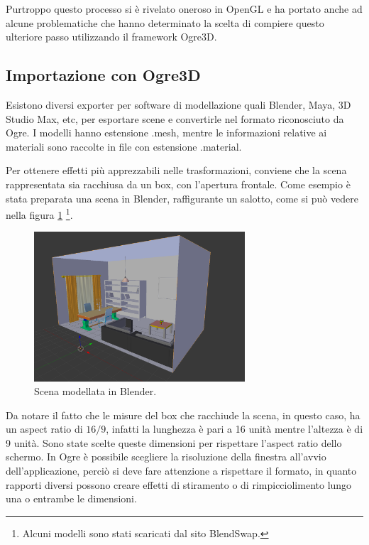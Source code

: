 Purtroppo questo processo si è rivelato oneroso in OpenGL e ha portato anche ad alcune problematiche che hanno determinato la scelta di compiere questo ulteriore passo utilizzando il framework Ogre3D.

\subsection{Importazione con Ogre3D}
Esistono diversi exporter per software di modellazione quali Blender, Maya, 3D Studio Max, etc, per esportare scene e convertirle nel formato riconosciuto da Ogre. I modelli hanno estensione .mesh, mentre le informazioni relative ai materiali sono raccolte in file con estensione .material.

Per ottenere effetti più apprezzabili nelle trasformazioni, conviene che la scena rappresentata sia racchiusa da un box, con l'apertura frontale. Come esempio è stata preparata una scena in Blender, raffigurante un salotto, come si può vedere nella figura \ref{liv-room} \footnote{Alcuni modelli sono stati scaricati dal sito BlendSwap\cite{blendswap}.}.

\begin{figure}[htbp]
\centering
\includegraphics[width=0.7\textwidth]{images/progetto/living-room.png}
\caption{Scena modellata in Blender.\label{liv-room}}
\end{figure}

Da notare il fatto che le misure del box che racchiude la scena, in questo caso, ha un aspect ratio di $16/9$, infatti la lunghezza è pari a 16 unità mentre l'altezza è di 9 unità. Sono state scelte queste dimensioni per rispettare l'aspect ratio dello schermo. In Ogre è possibile scegliere la risoluzione della finestra all'avvio dell'applicazione, perciò si deve fare attenzione a rispettare il formato, in quanto rapporti diversi possono creare effetti di stiramento o di rimpicciolimento lungo una o entrambe le dimensioni.

